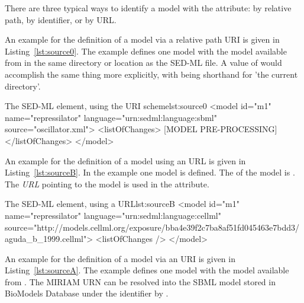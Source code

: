 \begin{blockChanged}
There are three typical ways to identify a model with the  attribute:  by relative path, by identifier, or by URL.

An example for the definition of a model via a relative path URI is given in Listing~\ref{lst:source0}. The example defines one model  with the model  available from  in the same directory or location as the SED-ML file.  A  value of  would accomplish the same thing more explicitly, with  being shorthand for 'the current directory'.

\begin{myXmlLst}{The SED-ML  element, using the URI scheme}{lst:source0}
<model id="m1" name="repressilator" language="urn:sedml:language:sbml" 
	source="oscillator.xml">
	<listOfChanges>
		[MODEL PRE-PROCESSING]
	</listOfChanges>
</model>
\end{myXmlLst}

\end{blockChanged}

An example for the definition of a model using an URL is given in Listing~\ref{lst:sourceB}. In the example one model is defined. The  of the model is . The \emph{URL} pointing to the model is used in the  attribute.

\begin{myXmlLst}{The SED-ML  element, using a URL}{lst:sourceB}
<model id="m1" name="repressilator" language="urn:sedml:language:cellml" 
	source="http://models.cellml.org/exposure/bba4e39f2c7ba8af51fd045463e7bdd3/aguda_b_1999.cellml">
	<listOfChanges />
</model>
\end{myXmlLst}

  An example for the definition of a model via an URI is given in Listing~\ref{lst:sourceA}. The example defines one model  with the model  available from . The MIRIAM URN can be resolved into the SBML model stored in BioModels Database under the identifier  by .

